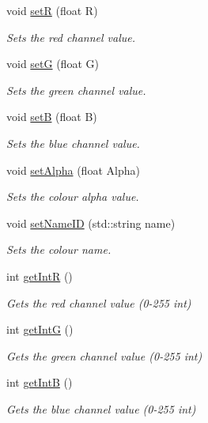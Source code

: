 \begin{DoxyCompactItemize}
void \hyperlink{classColour_ade98ca5af3cde8f754e9b255dcaaeb24}{setR} (float R)
\begin{DoxyCompactList}\small\item\em Sets the red channel value. \end{DoxyCompactList}\item 
void \hyperlink{classColour_a7486867cf650aa822660cf40c394e06c}{setG} (float G)
\begin{DoxyCompactList}\small\item\em Sets the green channel value. \end{DoxyCompactList}\item 
void \hyperlink{classColour_ab29d4612841a580f2b668f1f2710b978}{setB} (float B)
\begin{DoxyCompactList}\small\item\em Sets the blue channel value. \end{DoxyCompactList}\item 
void \hyperlink{classColour_a894ca29ba370974e7e0be904ca9ba65e}{set\+Alpha} (float Alpha)
\begin{DoxyCompactList}\small\item\em Sets the colour alpha value. \end{DoxyCompactList}\item 
void \hyperlink{classColour_aeff40cb4f5ed87207c0efb2de32c01ad}{set\+Name\+ID} (std\+::string name)
\begin{DoxyCompactList}\small\item\em Sets the colour name. \end{DoxyCompactList}\item 
int \hyperlink{classColour_a3ac86075f6a02085c2d80c6648409f01}{get\+IntR} ()
\begin{DoxyCompactList}\small\item\em Gets the red channel value (0-\/255 int) \end{DoxyCompactList}\item 
int \hyperlink{classColour_a417a9c415589e6bb1163ca2e264ccb61}{get\+IntG} ()
\begin{DoxyCompactList}\small\item\em Gets the green channel value (0-\/255 int) \end{DoxyCompactList}\item 
int \hyperlink{classColour_a01d2ae35756ace52645d02be5ca001e0}{get\+IntB} ()
\begin{DoxyCompactList}\small\item\em Gets the blue channel value (0-\/255 int) \end{DoxyCompactList}\item 

\end{DoxyCompactItemize}
